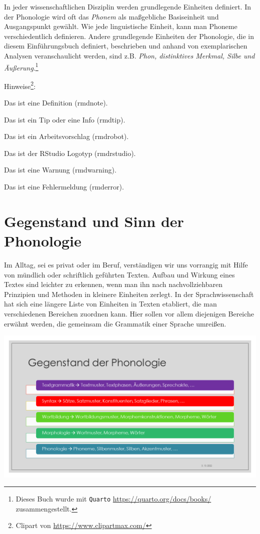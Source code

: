 \documentclass[
  letterpaper,
]{scrbook}
\begin{document}
In jeder wissenschaftlichen Disziplin werden grundlegende Einheiten
definiert. In der Phonologie wird oft das \emph{Phonem} als maßgebliche
Basiseinheit und Ausgangspunkt gewählt. Wie jede linguistische Einheit,
kann man Phoneme verschiedentlich definieren. Andere grundlegende
Einheiten der Phonologie, die in diesem Einführungsbuch definiert,
beschrieben und anhand von exemplarischen Analysen veranschaulicht
werden, sind z.B. \emph{Phon, distinktives Merkmal, Silbe und
Äußerung}.\footnote{Dieses Buch wurde mit \texttt{Quarto}
  \url{https://quarto.org/docs/books/} zusammengestellt.}

Hinweise\footnote{Clipart von \url{https://www.clipartmax.com/}}:

Das ist eine Definition (rmdnote).

Das ist ein Tip oder eine Info (rmdtip).

Das ist ein Arbeitsvorschlag (rmdrobot).

Das ist der RStudio Logotyp (rmdrstudio).

Das ist eine Warnung (rmdwarning).

Das ist eine Fehlermeldung (rmderror).

\hypertarget{sec-gegenstand}{%
\chapter{Gegenstand und Sinn der Phonologie}\label{sec-gegenstand}}

Im Alltag, sei es privat oder im Beruf, verständigen wir uns vorrangig
mit Hilfe von mündlich oder schriftlich geführten Texten. Aufbau und
Wirkung eines Textes sind leichter zu erkennen, wenn man ihn nach
nachvollziehbaren Prinzipien und Methoden in kleinere Einheiten zerlegt.
In der Sprachwissenschaft hat sich eine längere Liste von Einheiten in
Texten etabliert, die man verschiedenen Bereichen zuordnen kann. Hier
sollen vor allem diejenigen Bereiche erwähnt werden, die gemeinsam die
Grammatik einer Sprache umreißen.

\includegraphics[width=1\textwidth,height=\textheight]{./pictures/Diapozitiv9.PNG}
\end{document}
